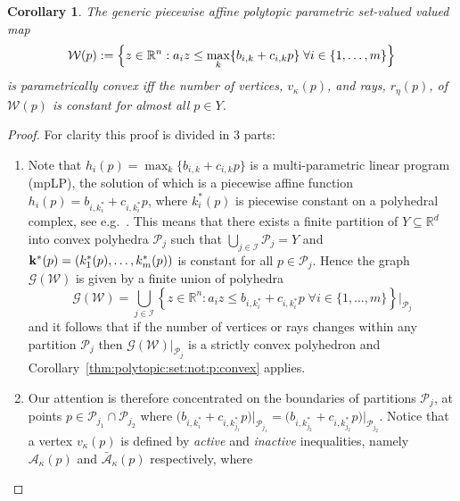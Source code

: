 \documentclass[final]{elsarticle}
\newcounter{thmcount}
\newtheorem{cor}[thmcount]{Corollary}
\theoremstyle{remark}
\theoremstyle{definition}
\begin{document}
%
\begin{cor}\label{thm:p:convexity:PWA:set:constant:num:verts}
The generic piecewise affine polytopic parametric set-valued valued map 
%
\begin{equation}\label{eq:definition:PWA:polytopic:set:general}
  \mathcal W(p) := \Bigl\{z\in\mathbb R^n: a_i z \leq \max_{k}\{b_{i,k} + c_{i,k}p\} \; \forall i\in\{1,\dots,m\} \Bigr\}
\end{equation}
%
is parametrically convex iff the number of vertices, $v_\kappa(p)$, and rays, $r_\eta(p)$, of~$\mathcal W(p)$ is constant for almost all $p\in Y$.
\end{cor}
%
\begin{proof}
For clarity this proof is divided in 3 parts:
\begin{enumerate}
\item Note that $h_i(p) = \max_{k} \{b_{i,k} + c_{i,k}p\}$ is a multi-parametric linear program (mpLP),
the solution of which is a piecewise affine function $h_i(p) = b_{i,k^\ast_i} + c_{i,k^\ast_i}p$, where $k^\ast_i(p)$ is piecewise constant on a polyhedral complex, see e.g.~\cite{spjotvold:2005}.
%
This means that there exists a finite partition of $Y\subseteq\mathbb R^d$ into convex polyhedra 
$\mathcal P_j$ such that $\bigcup_{j\in\mathcal I} \mathcal P_j = Y$ and 
${\bf{k}}^\ast(p) = (k_1^\ast(p),\dots,k_m^\ast(p))$ is constant for all $p \in \mathcal P_j$.
%
Hence the graph $\mathscr G(\mathcal W)$ is given by a finite union of polyhedra
%
\begin{equation*}
  \mathscr G(\mathcal W) = \bigcup_{j\in\mathcal I} \left\{z\in\mathbb R^n: a_i z \leq b_{i,k_i^\ast} + c_{i,k_i^\ast}p \; \forall i \in\{1,\dots,m\} \right\}\bigr\vert_{\mathcal P_{j}}
\end{equation*}
%
and it follows that if the number of vertices or rays changes within any partition $\mathcal P_j$ then $\mathscr
G(\mathcal W)\vert_{\mathcal P_j}$ is a strictly convex polyhedron and Corollary~\ref{thm:polytopic:set:not:p:convex} applies.
%
\item Our attention is therefore concentrated on the boundaries of partitions $\mathcal P_j$, at points $p\in\mathcal P_{j_1} \cap \mathcal P_{j_2}$ where 
$\bigl(b_{i,k_i^\ast} + c_{i,k_{j_1}^\ast} p\bigr)\bigr\rvert_{\mathcal P_{j_1}} = 
\bigl(b_{i,k_{j_2}^\ast} + c_{i,k_{j_2}^\ast} p\bigr)\bigr\rvert_{\mathcal P_{j_2}}$.
%
Notice that a vertex $v_\kappa(p)$ is defined by \emph{active} and \emph{inactive} inequalities, namely $\mathcal A_\kappa(p)$ and
$\bar{\mathcal A}_\kappa(p)$ respectively, where

\end{enumerate}
\end{proof}
\end{document}
